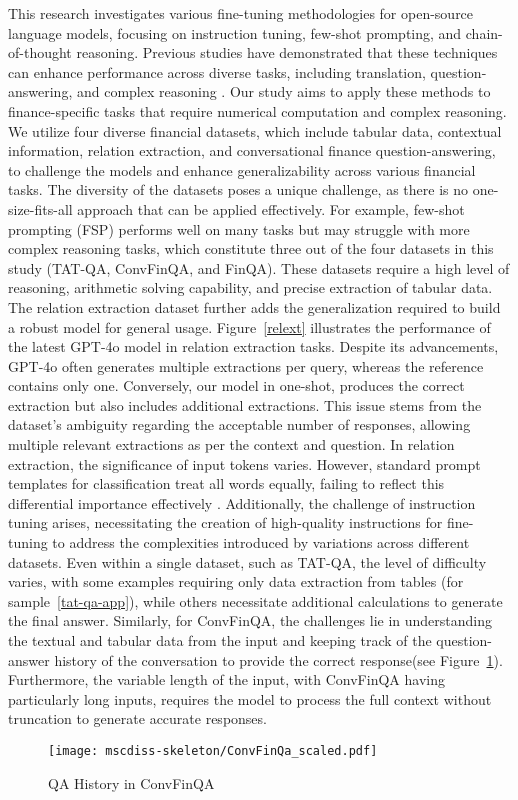 \documentclass[logo,msc]{infthesis}           %
\begin{document}
This research investigates various fine-tuning methodologies for open-source language models, focusing on instruction tuning, few-shot prompting, and chain-of-thought reasoning. Previous studies have demonstrated that these techniques can enhance performance across diverse tasks, including translation, question-answering, and complex reasoning \cite{wei2022finetunedlanguagemodelszeroshot,kojima2023largelanguagemodelszeroshot,brown2020language}. Our study aims to apply these methods to finance-specific tasks that require numerical computation and complex reasoning. We utilize four diverse financial datasets, which include tabular data, contextual information, relation extraction, and conversational finance question-answering, to challenge the models and enhance generalizability across various financial tasks. The diversity of the datasets poses a unique challenge, as there is no one-size-fits-all approach that can be applied effectively. For example, few-shot prompting (FSP) performs well on many tasks but may struggle with more complex reasoning tasks, which constitute three out of the four datasets in this study (TAT-QA, ConvFinQA, and FinQA). These datasets require a high level of reasoning, arithmetic solving capability, and precise extraction of tabular data. The relation extraction dataset further adds the generalization required to build a robust model for general usage. Figure~\ref{relext} illustrates the performance of the latest GPT-4o model in relation extraction tasks. Despite its advancements, GPT-4o often generates multiple extractions per query, whereas the reference contains only one. Conversely, our model in one-shot, produces the correct extraction but also includes additional extractions. This issue stems from the dataset's ambiguity regarding the acceptable number of responses, allowing multiple relevant extractions as per the context and question. In relation extraction, the significance of input tokens varies. However, standard prompt templates for classification treat all words equally, failing to reflect this differential importance effectively \cite{liu2021pretrainpromptpredictsystematic}. Additionally, the challenge of instruction tuning arises, necessitating the creation of high-quality instructions for fine-tuning to address the complexities introduced by variations across different datasets. Even within a single dataset, such as TAT-QA, the level of difficulty varies, with some examples requiring only data extraction from tables (for sample~\ref{tat-qa-app}), while others necessitate additional calculations to generate the final answer. Similarly, for ConvFinQA, the challenges lie in understanding the textual and tabular data from the input and keeping track of the question-answer history of the conversation to provide the correct response(see Figure~\ref{convfin}). Furthermore, the variable length of the input, with ConvFinQA having particularly long inputs, requires the model to process the full context without truncation to generate accurate responses.
\begin{figure}[h]
    \centering
    \texttt{[image: mscdiss-skeleton/ConvFinQa\_scaled.pdf]}  
    \caption{QA History in ConvFinQA}
    \label{convfin}

\end{figure}
\end{document}
